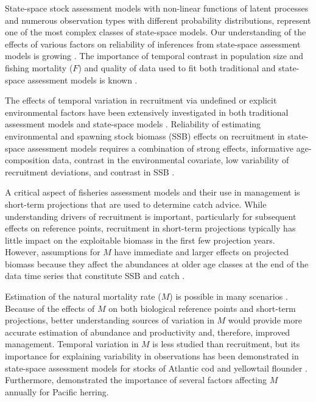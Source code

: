 \documentclass[
  12pt,
]{article}
\begin{document}
State-space stock assessment models with non-linear functions of latent
processes and numerous observation types with different probability
distributions, represent one of the most complex classes of state-space
models. Our understanding of the effects of various factors on
reliability of inferences from state-space assessment models is growing
\citep{lietal24, milleretal26}. The importance of temporal contrast in
population size and fishing mortality (\(F\)) and quality of data used
to fit both traditional and state-space assessment models is known
\citep{magnussonhilborn07, milleretal26}.

The effects of temporal variation in recruitment via undefined or
explicit environmental factors have been extensively investigated in
both traditional assessment models and state-space models
\citep{myers98, haltuchpunt11, johnsonetal16, milleretal16}. Reliability
of estimating environmental and spawning stock biomass (SSB) effects on
recruitment in state-space assessment models requires a combination of
strong effects, informative age-composition data, contrast in the
environmental covariate, low variability of recruitment deviations, and
contrast in SSB \citep{brittenetal26, milleretal26}.

A critical aspect of fisheries assessment models and their use in
management is short-term projections that are used to determine catch
advice. While understanding drivers of recruitment is important,
particularly for subsequent effects on reference points, recruitment in
short-term projections typically has little impact on the exploitable
biomass in the first few projection years. However, assumptions for
\(M\) have immediate and larger effects on projected biomass because
they affect the abundances at older age classes at the end of the data
time series that constitute SSB and catch
\citep{brodziaketal08, stocketal21}.

Estimation of the natural mortality rate (\(M\)) is possible in many
scenarios \citep{leeetal11, millerhyun18, milleretal26}. Because of the
effects of \(M\) on both biological reference points and short-term
projections, better understanding sources of variation in \(M\) would
provide more accurate estimation of abundance and productivity and,
therefore, improved management. Temporal variation in \(M\) is less
studied than recruitment, but its importance for explaining variability
in observations has been demonstrated in state-space assessment models
for stocks of Atlantic cod and yellowtail flounder
\citep[e.g.,][]{cadigan16, stocketal21}. Furthermore,
\citet{derisoetal08} demonstrated the importance of several factors
affecting \(M\) annually for Pacific herring.
\end{document}
